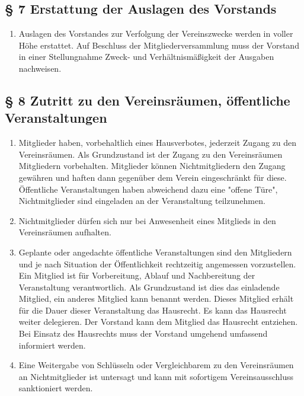 \documentclass[10pt,a4paper]{article}
\begin{document}
\subsection*{§ 7 Erstattung der Auslagen des Vorstands}
\begin{enumerate}
\item Auslagen des Vorstandes zur Verfolgung der Vereinszwecke werden
	in voller Höhe erstattet. Auf Beschluss der Mitgliederversammlung
	muss der Vorstand in einer Stellungnahme Zweck- und Verhältnis\-mäßigkeit
	der Ausgaben nachweisen.
\end{enumerate}

\subsection*{§ 8 Zutritt zu den Vereinsräumen, öffentliche Veranstaltungen}
\begin{enumerate}
\item Mitglieder haben, vorbehaltlich eines Hausverbotes, jederzeit Zugang zu 
	den Vereinsräumen. Als Grundzustand ist der Zugang zu den Vereinsräumen
	Mitgliedern vorbehalten. Mitglieder können Nichtmitgliedern den Zugang
	gewähren und haften dann gegenüber dem Verein eingeschränkt für diese.
	Öffentliche Veranstaltungen haben abweichend dazu eine "offene Türe",
	Nichtmitglieder sind eingeladen an der Veranstaltung teilzunehmen.
\item Nichtmitglieder dürfen sich nur bei Anwesenheit eines Mitglieds in den
	Vereinsräumen aufhalten.
\item Geplante oder angedachte öffentliche Veranstaltungen sind den Mitgliedern und
	je nach Situation der Öffentlichkeit rechtzeitig angemessen vorzustellen.
	Ein Mitglied ist für Vorbereitung, Ablauf und Nachbereitung der Veranstaltung
	verantwortlich. Als Grundzustand ist dies das einladende Mitglied, ein anderes
	Mitglied kann benannt werden. Dieses Mitglied erhält für die Dauer dieser 
	Veranstaltung das Hausrecht. Es kann das Hausrecht weiter delegieren. Der
	Vorstand kann dem Mitglied das Hausrecht entziehen. Bei Einsatz des Hausrechts
	muss der Vorstand umgehend umfassend informiert werden.
\item Eine Weitergabe von Schlüsseln oder Vergleichbarem zu den Vereinsräumen an 
	Nichtmitglieder ist untersagt und kann mit sofortigem Vereinsausschluss 
	sanktioniert werden.
\end{enumerate}
\end{document}
